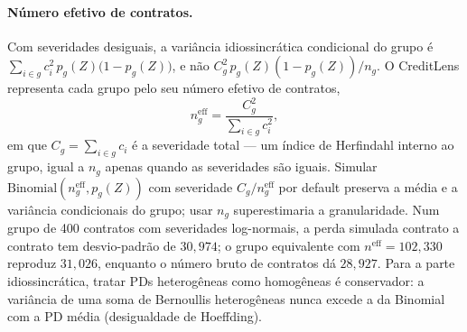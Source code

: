 \documentclass[11pt,a4paper]{article}
\begin{document}
\paragraph{Número efetivo de contratos.} Com severidades desiguais, a variância idiossincrática condicional do grupo é $\sum_{i\in g}c_i^2\,p_g(Z)\bigl(1-p_g(Z)\bigr)$, e não $C_g^2\,p_g(Z)(1-p_g(Z))/n_g$. O CreditLens representa cada grupo pelo seu número efetivo de contratos,
\begin{equation}
n_g^{\mathrm{eff}}=\frac{C_g^2}{\sum_{i\in g}c_i^2},
\label{eq:neff}
\end{equation}
em que $C_g=\sum_{i\in g}c_i$ é a severidade total --- um índice de Herfindahl interno ao grupo, igual a $n_g$ apenas quando as severidades são iguais. Simular $\mathrm{Binomial}(n_g^{\mathrm{eff}},p_g(Z))$ com severidade $C_g/n_g^{\mathrm{eff}}$ por default preserva a média e a variância condicionais do grupo; usar $n_g$ superestimaria a granularidade. Num grupo de 400 contratos com severidades log-normais, a perda simulada contrato a contrato tem desvio-padrão de $30{,}974$; o grupo equivalente com $n^{\mathrm{eff}}=102{,}330$ reproduz $31{,}026$, enquanto o número bruto de contratos dá $28{,}927$. Para a parte idiossincrática, tratar PDs heterogêneas como homogêneas é conservador: a variância de uma soma de Bernoullis heterogêneas nunca excede a da Binomial com a PD média (desigualdade de Hoeffding).
\end{document}

